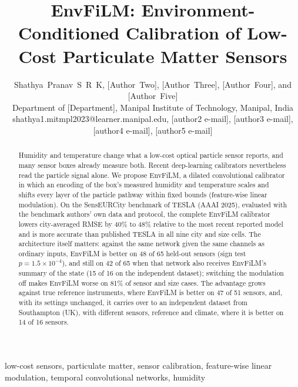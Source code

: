 \documentclass[journal]{IEEEtran}
\begin{document}
\title{EnvFiLM: Environment-Conditioned Calibration of Low-Cost Particulate Matter Sensors}

\author{Shathya~Pranav~S~R~K, [Author~Two], [Author~Three], [Author~Four], and [Author~Five]\\[4pt]
{\small Department of [Department], Manipal Institute of Technology, Manipal, India}\\[2pt]
{\footnotesize shathya1.mitmpl2023@learner.manipal.edu, [author2 e-mail], [author3 e-mail],
[author4 e-mail], [author5 e-mail]}}

\maketitle

\begin{abstract}
Humidity and temperature change what a low-cost optical particle sensor reports, and many sensor boxes already measure
both. Recent deep-learning calibrators nevertheless read the particle signal alone. We propose EnvFiLM, a dilated
convolutional calibrator in which an encoding of the box's measured humidity and temperature scales and shifts every
layer of the particle pathway within fixed bounds (feature-wise linear modulation). On the SensEURCity benchmark of TESLA
(AAAI 2025), evaluated with the benchmark authors' own data and protocol, the complete EnvFiLM calibrator lowers
city-averaged RMSE by 40\% to 48\% relative to the most recent reported model and is more accurate than published
TESLA in all nine city and size cells. The architecture itself matters: against the same network given the same channels as
ordinary inputs, EnvFiLM is better on 48 of 65 held-out sensors (sign test $p = 1.5\times10^{-4}$), and still on 42
of 65 when that network also receives EnvFiLM's summary of the state (15 of 16 on the independent dataset);
switching the modulation off makes EnvFiLM worse
on 81\% of sensor and size cases. The advantage grows against true reference
instruments, where EnvFiLM is better on 47 of 51 sensors, and, with its settings unchanged, it carries over to an independent dataset from
Southampton (UK), with different sensors, reference and climate, where it is better on 14 of 16 sensors.
\end{abstract}

\begin{IEEEkeywords}
low-cost sensors, particulate matter, sensor calibration, feature-wise linear modulation, temporal convolutional networks, humidity
\end{IEEEkeywords}
\end{document}
